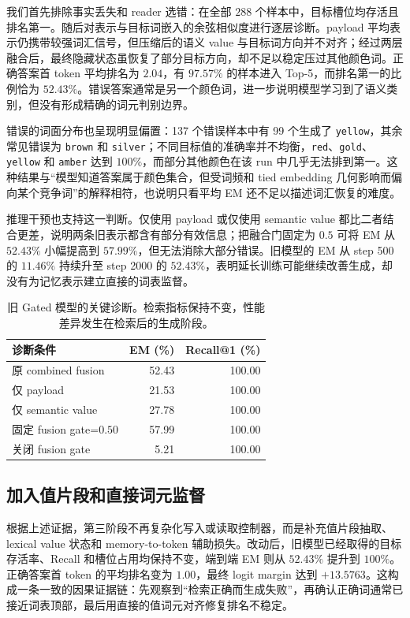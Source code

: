\documentclass[letterpaper]{article}
\begin{document}
我们首先排除事实丢失和 reader 选错：在全部 $288$ 个样本中，目标槽位均存活且排名第一。随后对表示与目标词嵌入的余弦相似度进行逐层诊断。payload 平均表示仍携带较强词汇信号，但压缩后的语义 value 与目标词方向并不对齐；经过两层融合后，最终隐藏状态虽恢复了部分目标方向，却不足以稳定压过其他颜色词。正确答案首 token 平均排名为 $2.04$，有 $97.57\%$ 的样本进入 Top-5，而排名第一的比例恰为 $52.43\%$。错误答案通常是另一个颜色词，进一步说明模型学习到了语义类别，但没有形成精确的词元判别边界。

错误的词面分布也呈现明显偏置：137 个错误样本中有 99 个生成了 \texttt{yellow}，其余常见错误为 \texttt{brown} 和 \texttt{silver}；不同目标值的准确率并不均衡，\texttt{red}、\texttt{gold}、\texttt{yellow} 和 \texttt{amber} 达到 $100\%$，而部分其他颜色在该 run 中几乎无法排到第一。这种结果与“模型知道答案属于颜色集合，但受词频和 tied embedding 几何影响而偏向某个竞争词”的解释相符，也说明只看平均 EM 还不足以描述词汇恢复的难度。

推理干预也支持这一判断。仅使用 payload 或仅使用 semantic value 都比二者结合更差，说明两条旧表示都含有部分有效信息；把融合门固定为 $0.5$ 可将 EM 从 $52.43\%$ 小幅提高到 $57.99\%$，但无法消除大部分错误。旧模型的 EM 从 step 500 的 $11.46\%$ 持续升至 step 2000 的 $52.43\%$，表明延长训练可能继续改善生成，却没有为记忆表示建立直接的词表监督。

\begin{table}[t]
\centering
\caption{旧 Gated 模型的关键诊断。检索指标保持不变，性能差异发生在检索后的生成阶段。}
\label{tab:diagnostic}
\begin{tabular}{lrr}
\toprule
诊断条件 & EM (\%) & Recall@1 (\%)\\
\midrule
原 combined fusion & 52.43 & 100.00\\
仅 payload & 21.53 & 100.00\\
仅 semantic value & 27.78 & 100.00\\
固定 fusion gate=$0.50$ & 57.99 & 100.00\\
关闭 fusion gate & 5.21 & 100.00\\
\bottomrule
\end{tabular}
\end{table}

\subsection{加入值片段和直接词元监督}

根据上述证据，第三阶段不再复杂化写入或读取控制器，而是补充值片段抽取、lexical value 状态和 memory-to-token 辅助损失。改动后，旧模型已经取得的目标存活率、Recall 和槽位占用均保持不变，端到端 EM 则从 $52.43\%$ 提升到 $100\%$。正确答案首 token 的平均排名变为 $1.00$，最终 logit margin 达到 $+13.5763$。这构成一条一致的因果证据链：先观察到“检索正确而生成失败”，再确认正确词通常已接近词表顶部，最后用直接的值词元对齐修复排名不稳定。
\end{document}
